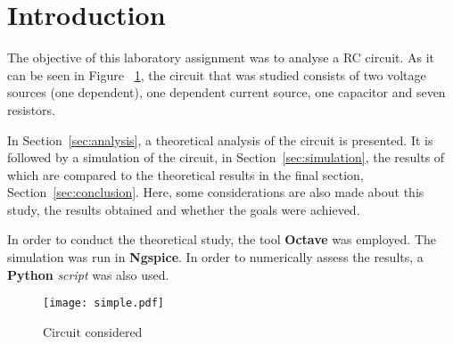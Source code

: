 \section{Introduction}
\label{sec:introduction}

The objective of this laboratory assignment was to analyse a RC circuit. As it can be seen in Figure ~\ref{circuit}, the circuit that was studied consists of two voltage sources (one dependent), one dependent current source, one capacitor and seven resistors.

In Section~\ref{sec:analysis}, a theoretical analysis of the circuit is presented. It is followed by a simulation of the circuit, in Section~\ref{sec:simulation}, the results of which are compared to the theoretical results in the final section, Section~\ref{sec:conclusion}. Here, some  considerations are also made about this study, the results obtained and whether the goals were achieved.

In order to conduct the theoretical study, the tool {\bf Octave} was employed. The simulation was run in {\bf Ngspice}. In order to numerically assess the results, a {\bf Python} {\it script} was also used.


\begin{figure}[H]
  \centering
  \texttt{[image: simple.pdf]}
  \caption{Circuit considered}
  \label{circuit}
\end{figure}

